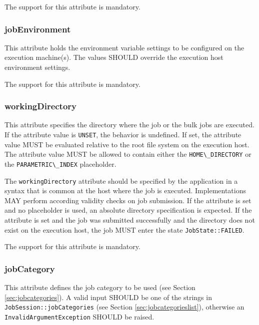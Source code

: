 \documentclass{article}
\newcommand{\h}[1]{\lstinline|#1|}
\newcommand{\rat}[1]{}
\begin{document}
The support for this attribute is mandatory.

\rat{
The differentiation between re-runnable and checkpointable was decided on a conf call (Aug 25th 2010). Checkpointability indication was intentionally left out, since there is no common understanding in the DRM systems (conf call Apr. 27th, 2011).
}

\subsubsection{jobEnvironment}

This attribute holds the environment variable settings to be configured on the execution machine(s). The values SHOULD override the execution host environment settings. 

The support for this attribute is mandatory.

\subsubsection{workingDirectory}

This attribute specifies the directory where the job or the bulk jobs are executed. If the attribute value is \h{UNSET}, the behavior is undefined. If set, the attribute value MUST be evaluated relative to the root file system on the execution host. The attribute value MUST be allowed to contain either the \h{HOME\_DIRECTORY} or the \h{PARAMETRIC\_INDEX} placeholder.

The \h{workingDirectory} attribute should be specified by the application in a syntax that is common at the host where the job is executed. Implementations MAY perform according validity checks on job submission. If the attribute is set and no placeholder is used, an absolute directory specification is expected. If the attribute is set and the job was submitted successfully and the directory does not exist on the execution host, the job MUST enter the state \h{JobState::FAILED}.

The support for this attribute is mandatory.

\subsubsection{jobCategory}

This attribute defines the job category to be used (see Section \ref{sec:jobcategories}). A valid input SHOULD be one of the strings in \h{JobSession::jobCategories} (see Section \ref{sec:jobcategorieslist}), otherwise an \h{InvalidArgumentException} SHOULD be raised.
\end{document}

